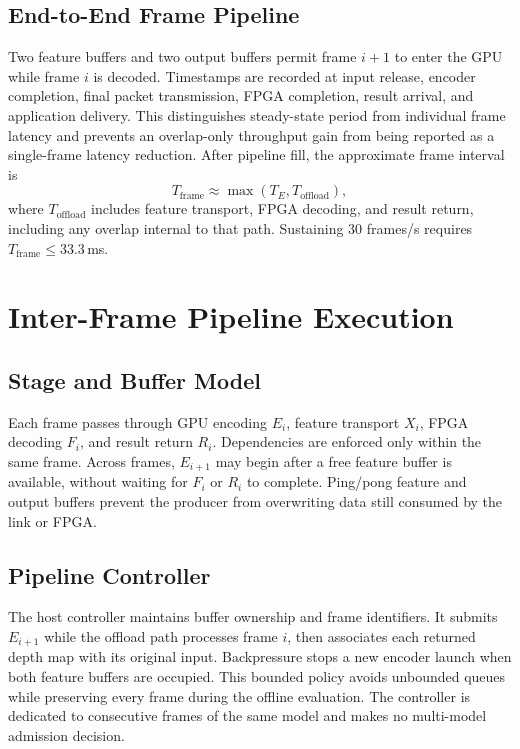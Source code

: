 \documentclass[sigconf]{support/acmart}
\begin{document}
\subsection{End-to-End Frame Pipeline}

Two feature buffers and two output buffers permit frame $i+1$ to enter the GPU
while frame $i$ is decoded.  Timestamps are recorded at input release, encoder
completion, final packet transmission, FPGA completion, result arrival, and
application delivery.  This distinguishes steady-state period from individual
frame latency and prevents an overlap-only throughput gain from being reported
as a single-frame latency reduction.  After pipeline fill, the approximate
frame interval is
\begin{equation}
  T_{\mathrm{frame}} \approx \max(T_E, T_{\mathrm{offload}}),
  \label{eq:pipeline-period}
\end{equation}
where $T_{\mathrm{offload}}$ includes feature transport, FPGA decoding, and
result return, including any overlap internal to that path.  Sustaining 30
frames/s requires $T_{\mathrm{frame}}\leq 33.3$\,ms.

\section{Inter-Frame Pipeline Execution}
\label{sec:pipeline}

\subsection{Stage and Buffer Model}

Each frame passes through GPU encoding $E_i$, feature transport $X_i$, FPGA
decoding $F_i$, and result return $R_i$.  Dependencies are enforced only within
the same frame.  Across frames, $E_{i+1}$ may begin after a free feature buffer
is available, without waiting for $F_i$ or $R_i$ to complete.  Ping/pong feature
and output buffers prevent the producer from overwriting data still consumed by
the link or FPGA.

\subsection{Pipeline Controller}

The host controller maintains buffer ownership and frame identifiers.  It
submits $E_{i+1}$ while the offload path processes frame $i$, then associates
each returned depth map with its original input.  Backpressure stops a new
encoder launch when both feature buffers are occupied.  This bounded policy
avoids unbounded queues while preserving every frame during the offline
evaluation.  The controller is dedicated to consecutive frames of the same
model and makes no multi-model admission decision.
\end{document}
